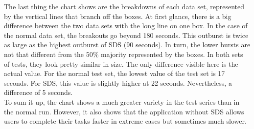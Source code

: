 The last thing the chart shows are the breakdowns of each data set, represented by the vertical lines that branch off the boxes. At first glance, there is a big difference between the two data sets with the long line on one box. In the case of the normal data set, the breakouts go beyond 180 seconds. This outburst is twice as large as the highest outburst of \ac{SDS} (90 seconds). In turn, the lower bursts are not that different from the 50\% majority represented by the boxes. In both sets of tests, they look pretty similar in size. The only difference visible here is the actual value. For the normal test set, the lowest value of the test set is 17 seconds. For \ac{SDS}, this value is slightly higher at 22 seconds. Nevertheless, a difference of 5 seconds. \\
To sum it up, the chart shows a much greater variety in the test series than in the normal run. However, it also shows that the application without SDS allows users to complete their tasks faster in extreme cases but sometimes much slower. 